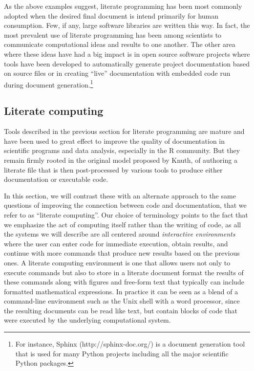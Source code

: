\documentclass[ChapterTOCs,krantz2]{krantz} %
\begin{document}
As the above examples suggest, literate programming has been most commonly
adopted when the desired final document is intend primarily for human
consumption.  Few, if any, large software libraries are written this way.
In fact, the most prevalent use of literate programming has been among
scientists to communicate computational ideas and results to one another.
The other area where these ideas have had a big impact is in open source
software projects where tools have been developed to automatically generate
project documentation based on source files or in creating ``live''
documentation with embedded code run during document generation.\footnote{
For instance, Sphinx (http://sphinx-doc.org/) is a document generation tool
that is used for many Python projects including all the major scientific
Python packages.} 

\subsection{Literate computing}

Tools described in the previous section for literate programming are mature and
have been used to great effect to improve the quality of documentation in
scientific programs and data analysis, especially in the R community.  But they
remain firmly rooted in the original model proposed by Knuth, of authoring a
literate file that is then post-processed by various tools to produce either
documentation or executable code.  

In this section, we will contrast these with an alternate approach to the same
questions of improving the connection between code and documentation, that we
refer to as ``literate computing''.  Our choice of terminology points to the
fact that we emphasize the act of computing itself rather than the writing of
code, as all the systems we will describe are all centered around
\emph{interactive environments} where the user can enter code for immediate
execution, obtain results, and continue with more commands that produce new
results based on the previous ones.  A literate computing environment is one
that allows users not only to execute commands but also to store in a literate
document format the results of these commands along with figures and free-form
text that typically can include formatted mathematical expressions.  In
practice it can be seen as a blend of a command-line environment such as the
Unix shell with a word processor, since the resulting documents can be read
like text, but contain blocks of code that were executed by the underlying
computational system.
\end{document}
